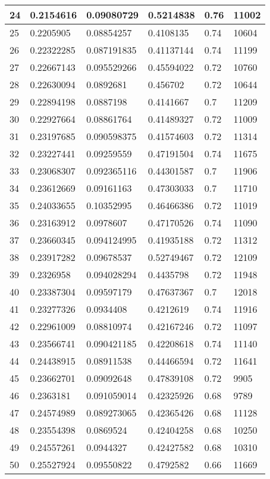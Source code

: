 \begin{longtable}{|l|l|l|l|l|l|}
24 & 0.2154616 & 0.09080729 & 0.5214838 & 0.76 & 11002 \\ \hline 
25 & 0.2205905 & 0.08854257 & 0.4108135 & 0.74 & 10604 \\ \hline 
26 & 0.22322285 & 0.087191835 & 0.41137144 & 0.74 & 11199 \\ \hline 
27 & 0.22667143 & 0.095529266 & 0.45594022 & 0.72 & 10760 \\ \hline 
28 & 0.22630094 & 0.0892681 & 0.456702 & 0.72 & 10644 \\ \hline 
29 & 0.22894198 & 0.0887198 & 0.4141667 & 0.7 & 11209 \\ \hline 
30 & 0.22927664 & 0.08861764 & 0.41489327 & 0.72 & 11009 \\ \hline 
31 & 0.23197685 & 0.090598375 & 0.41574603 & 0.72 & 11314 \\ \hline 
32 & 0.23227441 & 0.09259559 & 0.47191504 & 0.74 & 11675 \\ \hline 
33 & 0.23068307 & 0.092365116 & 0.44301587 & 0.7 & 11906 \\ \hline 
34 & 0.23612669 & 0.09161163 & 0.47303033 & 0.7 & 11710 \\ \hline 
35 & 0.24033655 & 0.10352995 & 0.46466386 & 0.72 & 11019 \\ \hline 
36 & 0.23163912 & 0.0978607 & 0.47170526 & 0.74 & 11090 \\ \hline 
37 & 0.23660345 & 0.094124995 & 0.41935188 & 0.72 & 11312 \\ \hline 
38 & 0.23917282 & 0.09678537 & 0.52749467 & 0.72 & 12109 \\ \hline 
39 & 0.2326958 & 0.094028294 & 0.4435798 & 0.72 & 11948 \\ \hline 
40 & 0.23387304 & 0.09597179 & 0.47637367 & 0.7 & 12018 \\ \hline 
41 & 0.23277326 & 0.0934408 & 0.4212619 & 0.74 & 11916 \\ \hline 
42 & 0.22961009 & 0.08810974 & 0.42167246 & 0.72 & 11097 \\ \hline 
43 & 0.23566741 & 0.090421185 & 0.42208618 & 0.74 & 11140 \\ \hline 
44 & 0.24438915 & 0.08911538 & 0.44466594 & 0.72 & 11641 \\ \hline 
45 & 0.23662701 & 0.09092648 & 0.47839108 & 0.72 & 9905 \\ \hline 
46 & 0.2363181 & 0.091059014 & 0.42325926 & 0.68 & 9789 \\ \hline 
47 & 0.24574989 & 0.089273065 & 0.42365426 & 0.68 & 11128 \\ \hline 
48 & 0.23554398 & 0.0869524 & 0.42404258 & 0.68 & 10250 \\ \hline 
49 & 0.24557261 & 0.0944327 & 0.42427582 & 0.68 & 10310 \\ \hline 
50 & 0.25527924 & 0.09550822 & 0.4792582 & 0.66 & 11669 \\ \hline 
\end{longtable}